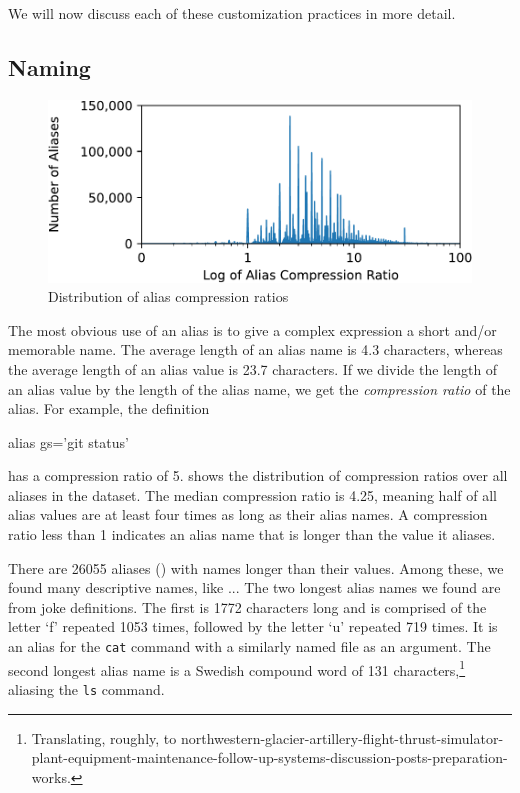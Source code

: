 We will now discuss each of these customization practices in more detail.


\subsection{Naming}

\begin{figure}
    \centering
    \includegraphics[width=0.95\columnwidth]{figures/compression.pdf}
    \caption{Distribution of alias compression ratios}
    \label{fig:compression}
\end{figure}

The most obvious use of an alias is to give a complex expression a short and/or memorable name.
The average length of an alias name is 4.3 characters, whereas the average length of an alias value is 23.7 characters.
If we divide the length of an alias value by the length of the alias name, we get the \emph{compression ratio} of the alias.
For example, the definition
\begin{CVerbatim}
alias gs='git status'
\end{CVerbatim}
has a compression ratio of 5.
 shows the distribution of compression ratios over all aliases in the dataset.
The median compression ratio is 4.25, meaning half of all alias values are at least four times as long as their alias names.
A compression ratio less than 1 indicates an alias name that is longer than the value it aliases.

There are \num{26055} aliases () with names longer than their values.
\TODO Among these, we found many descriptive names, like ...
The two longest alias names we found are from joke definitions.
The first is \num{1772} characters long and is comprised of the letter `f' repeated \num{1053} times, followed by the letter `u' repeated 719 times.
It is an alias for the \verb|cat| command with a similarly named file as an argument.
The second longest alias name is a Swedish compound word of \num{131} characters,\footnote{Translating, roughly, to northwestern-glacier-artillery-flight-thrust-simulator-plant-equipment-maintenance-follow-up-systems-discussion-posts-preparation-works.} aliasing the \verb|ls| command.

